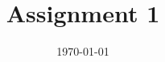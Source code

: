 \documentclass[
    aps,
    10pt,
    prd,
    notitlepage,
    twocolumn,s
    tightenlines,
    nofootinbib]{revtex4-1}
\begin{document}
\title{Assignment 1}
\begin{abstract}

\end{abstract}
\date{\today}
\maketitle
\end{document}
